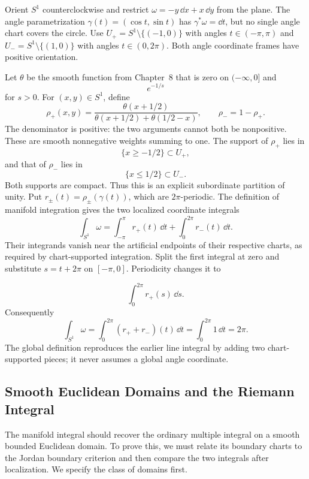 \begin{example}
Orient $S^1$ counterclockwise and restrict $\omega=-y\,\dd x+x\,\dd y$
from the plane. The angle parametrization $\gamma(t)=(\cos t,\sin t)$
has $\gamma^*\omega=\dd t$, but no single angle chart covers the circle.
Use $U_+=S^1\setminus\{(-1,0)\}$ with angles $t\in(-\pi,\pi)$ and
$U_-=S^1\setminus\{(1,0)\}$ with angles $t\in(0,2\pi)$.
Both angle coordinate frames have positive orientation.

Let $\theta$ be the smooth function from Chapter~8 that is zero on
$(-\infty,0]$ and
\[
e^{-1/s}
\]
 for $s>0$. For $(x,y)\in S^1$, define
\[
\rho_+(x,y)=\frac{\theta(x+1/2)}{\theta(x+1/2)+\theta(1/2-x)},
\qquad \rho_-=1-\rho_+.
\]
The denominator is positive: the two arguments cannot both be nonpositive.
These are smooth nonnegative weights summing to one.
The support of $\rho_+$ lies in
\[
\{x\geq-1/2\}\subset U_+,
\]
 and that
of $\rho_-$ lies in
\[
\{x\leq1/2\}\subset U_-.
\]
 Both supports are compact.
Thus this is an explicit subordinate partition of unity.
Put $r_\pm(t)=\rho_\pm(\gamma(t))$, which are $2\pi$-periodic. The
definition of manifold integration gives the two localized coordinate integrals
\[
\int_{S^1}\omega=\int_{-\pi}^{\pi}r_+(t)\,\dd t
+\int_0^{2\pi}r_-(t)\,\dd t.
\]
Their integrands vanish near the artificial endpoints of their respective
charts, as required by chart-supported integration. Split the first integral
at zero and substitute $s=t+2\pi$ on $[-\pi,0]$. Periodicity changes it to

\[
\int_0^{2\pi}r_+(s)\,\dd s.
\]
 Consequently
\[
\int_{S^1}\omega=\int_0^{2\pi}(r_++r_-)(t)\,\dd t
=\int_0^{2\pi}1\,\dd t=2\pi.
\]
The global definition reproduces the earlier line integral by adding two
chart-supported pieces; it never assumes a global angle coordinate.
\end{example}

\subsection{Smooth Euclidean Domains and the Riemann Integral}

The manifold integral should recover the ordinary multiple integral on
a smooth bounded Euclidean domain. To prove this, we must relate its
boundary charts to the Jordan boundary criterion and then compare the
two integrals after localization. We specify the class of domains first.

\label{sec:euclidean-integral-bridge}

